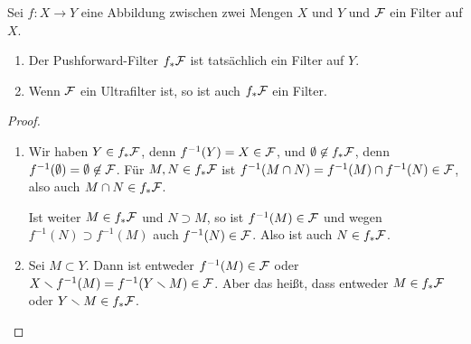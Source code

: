 \begin{lemma}
Sei $f\colon X\to Y$ eine Abbildung zwischen zwei Mengen $X$ und $Y$ und $\cal F$ ein Filter auf $X$.
\begin{enumerate}
\item Der Pushforward-Filter $f_*\cal F$ ist tatsächlich ein Filter auf $Y$.
\item Wenn $\cal F$ ein Ultrafilter ist, so ist auch $f_*\cal F$ ein Filter.
\end{enumerate}
\end{lemma}
\begin{proof}\leavevmode
\begin{enumerate}
\item Wir haben $Y\in f_*\cal F$, denn $f^{-1}(Y) = X\in\cal F$, und $\emptyset\not\in f_*\cal F$, denn $f^{-1}(\emptyset) = \emptyset\not\in\cal F$. Für $M,N\in f_*\cal F$ ist $f^{-1}(M\cap N) = f^{-1}(M)\cap f^{-1}(N)\in\cal F$, also auch $M\cap N\in f_*\cal F$.

Ist weiter $M\in f_*\cal F$ und $N\supset M$, so ist $f^{-1}(M)\in\cal F$ und wegen $f^{-1}(N)\supset f^{-1}(M)$ auch $f^{-1}(N)\in \cal F$. Also ist auch $N\in f_*\cal F$.
\item Sei $M\subset Y$. Dann ist entweder $f^{-1}(M)\in\cal F$ oder $X\setminus f^{-1}(M) = f^{-1}(Y\setminus M)\in\cal F$. Aber das heißt, dass entweder $M\in f_*\cal F$ oder $Y\setminus M\in f_*\cal F$.\qedhere
\end{enumerate}
\end{proof}

